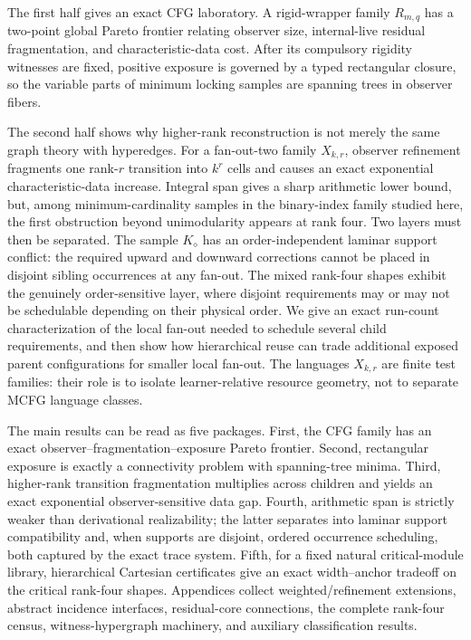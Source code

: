 \documentclass[11pt]{article}
\begin{document}
The first half gives an exact CFG laboratory.  A rigid-wrapper family
$R_{m,q}$ has a two-point global Pareto frontier relating observer size,
internal-live residual fragmentation, and characteristic-data cost.  After its
compulsory rigidity witnesses are fixed, positive exposure is governed by a
typed rectangular closure, so the variable parts of minimum locking samples
are spanning trees in observer fibers.

The second half shows why higher-rank reconstruction is not merely the same
graph theory with hyperedges.  For a fan-out-two family $X_{k,r}$, observer
refinement fragments one rank-$r$ transition into $k^r$ cells and causes an
exact exponential characteristic-data increase.  Integral span gives a sharp
arithmetic lower bound, but, among minimum-cardinality samples in the
binary-index family studied here, the first obstruction beyond unimodularity
appears at rank four.  Two layers must then be separated.  The sample
$K_{\diamond}$ has an order-independent laminar support conflict: the required
upward and downward corrections cannot be placed in disjoint sibling
occurrences at any fan-out.  The mixed rank-four shapes exhibit the genuinely
order-sensitive layer, where disjoint requirements may or may not be schedulable
depending on their physical order.  We give an exact run-count characterization
of the local fan-out needed to schedule several child requirements, and then
show how hierarchical reuse can trade additional exposed parent configurations
for smaller local fan-out.  The languages $X_{k,r}$ are finite test families: their
role is to isolate learner-relative resource geometry, not to separate MCFG
language classes.

The main results can be read as five packages.  First, the CFG family has an
exact observer--fragmentation--exposure Pareto frontier.  Second, rectangular
exposure is exactly a connectivity problem with spanning-tree minima.  Third,
higher-rank transition fragmentation multiplies across children and yields an
exact exponential observer-sensitive data gap.  Fourth, arithmetic span is
strictly weaker than derivational realizability; the latter separates into
laminar support compatibility and, when supports are disjoint, ordered
occurrence scheduling, both captured by the exact trace system.
Fifth, for a fixed natural critical-module library, hierarchical Cartesian
certificates give an exact width--anchor tradeoff on the critical rank-four
shapes.  Appendices collect weighted/refinement
extensions, abstract incidence interfaces, residual-core connections, the
complete rank-four census, witness-hypergraph machinery, and auxiliary
classification results.
\end{document}
